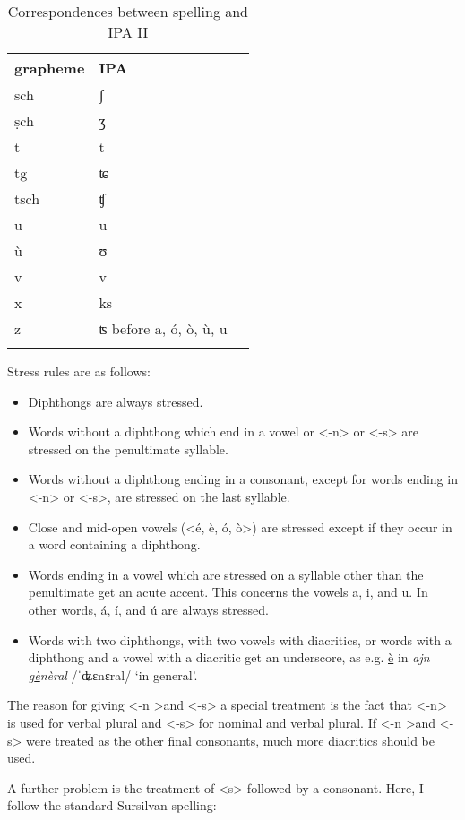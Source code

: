 \begin{table}
\caption{Correspondences between spelling and IPA II}
\label{graphIpaII} 
\begin{tabular}{lll}
    \lsptoprule
        grapheme      & IPA\\
    \midrule  
  sch & ʃ\\
  ṣch & ʒ\\
  t & t\\
  tg& ʨ\\
  tsch & ʧ\\
  u & u\\
  ù & ʊ\\
  v & v\\
  x & ks\\
  z & ʦ before a, ó, ò, ù, u\\
  \lspbottomrule
\end{tabular} 
\end{table}




Stress rules are as follows:

\begin{itemize}
\item Diphthongs are always stressed.
\item Words without a diphthong which end in a vowel or <-n> or <-s> are stressed on the penultimate syllable.
\item Words without a diphthong ending in a consonant, except for words ending in <-n> or <-s>, are stressed on the last syllable.
\item Close and mid-open vowels (<é, è, ó, ò>) are stressed except if they occur in a word containing a diphthong.
\item Words ending in a vowel which are stressed on a syllable other than the penultimate get an acute accent. This concerns the vowels a, i, and u. In other words, á, í, and ú are always stressed.
\item Words with two diphthongs, with two vowels with diacritics, or words with a diphthong and a vowel with a diacritic get an underscore, as e.g. \underline{è} in \textit{ajn g\underline{è}nèral} /ˈʥɛnɛral/ `in general'.
\end{itemize}
      
The reason for giving <-n >and <-s> a special treatment is the fact that <-n> is used for verbal plural and <-s> for nominal and verbal plural. If <-n >and <-s> were treated as the other final consonants, much more diacritics should be used.

A further problem is the treatment of <s> followed by a consonant. Here, I follow the standard Sursilvan spelling:

